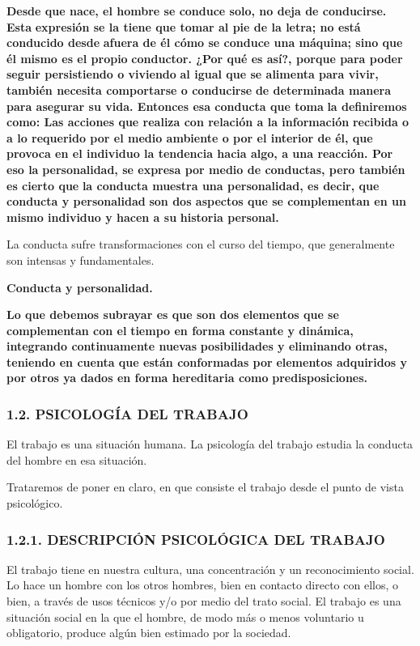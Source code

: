 \textbf{Desde que nace, el hombre se conduce solo, no deja de conducirse. Esta} \textbf{expresión se la tiene que tomar al pie de la letra; no está conducido desde} \textbf{afuera de él cómo se conduce una máquina; sino que él mismo es el propio} \textbf{conductor. ¿Por qué es así?, porque para poder seguir persistiendo o viviendo} \textbf{al igual que se alimenta para vivir, también necesita comportarse o conducirse} \textbf{de determinada manera para asegurar su vida. Entonces esa conducta que toma} \textbf{la definiremos como: Las acciones que realiza con relación a la información} \textbf{recibida o a lo requerido por el medio ambiente o por el interior de él, que} \textbf{provoca en el individuo la tendencia hacia algo, a una reacción. Por eso la} \textbf{personalidad, se expresa por medio de conductas, pero también es cierto que} \textbf{la conducta muestra una personalidad, es decir, que conducta y personalidad} \textbf{son dos aspectos que se complementan en un mismo individuo y hacen a su} \textbf{historia personal.}

La conducta sufre transformaciones con el curso del tiempo, que generalmente son intensas y fundamentales.

\textbf{Conducta y personalidad.}

\textbf{Lo que debemos subrayar es que son dos elementos que se complementan con el} \textbf{tiempo en forma constante y dinámica, integrando continuamente nuevas} \textbf{posibilidades y eliminando otras, teniendo en cuenta que están conformadas por} \textbf{elementos adquiridos y por otros ya dados en forma hereditaria como} \textbf{predisposiciones.}



\subsubsection*{1.2. PSICOLOGÍA DEL TRABAJO}
El trabajo es una situación humana. La psicología del trabajo estudia la conducta del hombre en esa situación.

Trataremos de poner en claro, en que consiste el trabajo desde el punto de vista psicológico.

\subsubsection*{1.2.1. DESCRIPCIÓN PSICOLÓGICA DEL TRABAJO}
El trabajo tiene en nuestra cultura, una concentración y un reconocimiento social. Lo hace un hombre con los otros hombres, bien en contacto directo con ellos, o bien, a través de usos técnicos y/o por medio del trato social. El trabajo es una situación social en la que el hombre, de modo más o menos voluntario u obligatorio, produce algún bien estimado por la sociedad.

